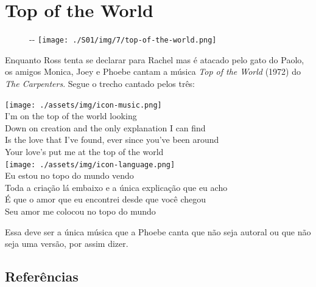 \hypertarget{top-of-the-world}{%
\section{Top of the World}\label{top-of-the-world}}

\begin{figure}[!ht]
  \begin{adjustwidth}{-\oddsidemargin-1in}{-\rightmargin}
    \centering
    \texttt{[image: ./S01/img/7/top-of-the-world.png]}
  \end{adjustwidth}
\end{figure}

Enquanto Ross tenta se declarar para Rachel mas é atacado pelo gato do
Paolo, os amigos Monica, Joey e Phoebe cantam a música \emph{Top of the
World} (1972) do \emph{The Carpenters}. Segue o trecho cantado pelos
três:

\bigskip
\begin{tcolorbox}[enhanced,
    drop fuzzy shadow southeast, boxrule=0.3pt,
    lower separated=false, sidebyside, sidebyside align=top,
    halign=flush right, halign lower=left, breakable,
    colframe=black!30!dialogoBorder,colback=musicaBg]
\texttt{[image: ./assets/img/icon-music.png]}\\
I’m on the top of the world looking\\Down on creation and the only explanation I can find\\Is the love that I’ve found, ever since you’ve been around\\Your love’s put me at the top of the world\\
\tcblower
\texttt{[image: ./assets/img/icon-language.png]}\\
Eu estou no topo do mundo vendo\\Toda a criação lá embaixo e a única explicação que eu acho\\É que o amor que eu encontrei desde que você chegou\\Seu amor me colocou no topo do mundo\\
\end{tcolorbox}

Essa deve ser a única música que a Phoebe canta que não seja autoral ou
que não seja uma versão, por assim dizer.

\hypertarget{referuxeancias-1}{%
\subsection{Referências}\label{referuxeancias-1}}

